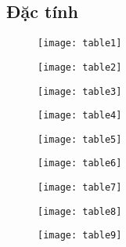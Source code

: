 \subsection{Đặc tính}
\begin{figure}[!htbp]
	\centering
	\texttt{[image: table1]}
	\label{fig:x cubed graph}
\end{figure}
\FloatBarrier
\begin{figure}[!htbp]
	\centering
	\texttt{[image: table2]}
	\label{fig:x cubed graph}
\end{figure}
\FloatBarrier
\begin{figure}[!htbp]
	\centering
	\texttt{[image: table3]}
	\label{fig:x cubed graph}
\end{figure}
\FloatBarrier
\begin{figure}[!htbp]
	\centering
	\texttt{[image: table4]}
	\label{fig:x cubed graph}
\end{figure}
\FloatBarrier
\begin{figure}[!htbp]
	\centering
	\texttt{[image: table5]}
	\label{fig:x cubed graph}
\end{figure}
\FloatBarrier
\begin{figure}[!htbp]
	\centering
	\texttt{[image: table6]}
	\label{fig:x cubed graph}
\end{figure}
\FloatBarrier
\begin{figure}[!htbp]
	\centering
	\texttt{[image: table7]}
	\label{fig:x cubed graph}
\end{figure}
\FloatBarrier
\begin{figure}[!htbp]
	\centering
	\texttt{[image: table8]}
	\label{fig:x cubed graph}
\end{figure}
\FloatBarrier
\begin{figure}[!htbp]
	\centering
	\texttt{[image: table9]}
	\label{fig:x cubed graph}
\end{figure}
\FloatBarrier


